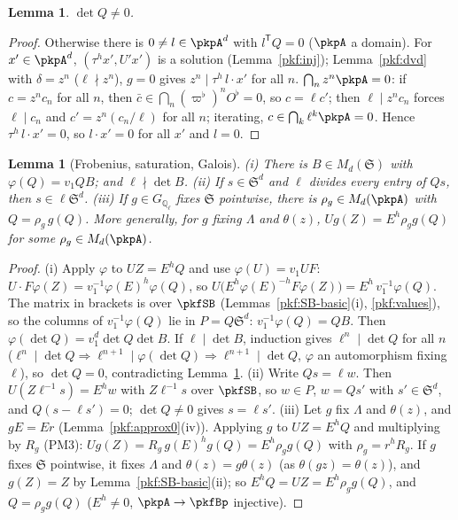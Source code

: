 \documentclass[10pt]{amsart}
\newtheorem{lemma}[theorem]{Lemma}
\theoremstyle{definition}
\theoremstyle{remark}
\newcommand{\Q}{\mathbb Q}
\begin{document}
\begin{lemma}\label{pkf:detQ}
$\det Q\ne0$.
\end{lemma}

\begin{proof}
Otherwise there is $0\ne l\in\pkpA^d$ with $l^{\mathsf T}Q=0$ ($\pkpA$ a domain). For $x'\in\pkpA^d$,
$(\tau^hx',U'x')$ is a solution (Lemma~\ref{pkf:inj}); Lemma~\ref{pkf:dvd} with $\delta=z^n$
($\ell\nmid z^n$), $g=0$ gives $z^n\mid\tau^h\,l\cdot x'$ for all $n$. \emph{$\bigcap_nz^n\pkpA=0$}: if
$c=z^nc_n$ for all $n$, then $\bar c\in\bigcap_n(\varpi^\flat)^nO^\flat=0$, so $c=\ell c'$; then $\ell\mid
z^nc_n$ forces $\ell\mid c_n$ and $c'=z^n(c_n/\ell)$ for all $n$; iterating, $c\in\bigcap_k\ell^k\pkpA=0$.
Hence $\tau^h\,l\cdot x'=0$, so $l\cdot x'=0$ for all $x'$ and $l=0$.
\end{proof}

\begin{lemma}[Frobenius, saturation, Galois]\label{pkf:FSG}
(i) There is $B\in M_d(\mathfrak S)$ with $\varphi(Q)=v_1QB$; and $\ell\nmid\det B$.
(ii) If $s\in\mathfrak S^d$ and $\ell$ divides every entry of $Qs$, then $s\in\ell\mathfrak S^d$.
(iii) If $g\in G_{\Q_\ell}$ fixes $\mathfrak S$ pointwise, there is $\rho_g\in M_d(\pkpA)$ with
$Q=\rho_g\,g(Q)$. More generally, for $g$ fixing $\Lambda$ and $\theta(z)$, $Ug(Z)=E^h\rho_gg(Q)$ for some
$\rho_g\in M_d(\pkpA)$.
\end{lemma}

\begin{proof}
(i) Apply $\varphi$ to $UZ=E^hQ$ and use $\varphi(U)=v_1UF$: $U\cdot F\varphi(Z)=v_1^{-1}\varphi(E)^h
\varphi(Q)$, so $U\bigl(E^h\varphi(E)^{-h}F\varphi(Z)\bigr)=E^h\,v_1^{-1}\varphi(Q)$. The matrix in brackets
is over $\pkfSB$ (Lemmas~\ref{pkf:SB-basic}(i), \ref{pkf:values}), so the columns of $v_1^{-1}\varphi(Q)$
lie in $P=Q\mathfrak S^d$: $v_1^{-1}\varphi(Q)=QB$. Then $\varphi(\det Q)=v_1^d\det Q\det B$. If
$\ell\mid\det B$, induction gives $\ell^n\mid\det Q$ for all $n$ ($\ell^n\mid\det Q\Rightarrow\ell^{n+1}\mid
\varphi(\det Q)\Rightarrow\ell^{n+1}\mid\det Q$, $\varphi$ an automorphism fixing $\ell$), so $\det Q=0$,
contradicting Lemma~\ref{pkf:detQ}.
(ii) Write $Qs=\ell w$. Then $U(Z\ell^{-1}s)=E^hw$ with $Z\ell^{-1}s$ over $\pkfSB$, so $w\in P$, $w=Qs'$
with $s'\in\mathfrak S^d$, and $Q(s-\ell s')=0$; $\det Q\ne0$ gives $s=\ell s'$.
(iii) Let $g$ fix $\Lambda$ and $\theta(z)$, and $gE=Er$ (Lemma~\ref{pkf:approx0}(iv)). Applying $g$ to
$UZ=E^hQ$ and multiplying by $R_g$ (PM3): $Ug(Z)=R_g\,g(E)^hg(Q)=E^h\rho_gg(Q)$ with
$\rho_g=r^hR_g$. If $g$ fixes $\mathfrak S$ pointwise, it fixes $\Lambda$ and $\theta(z)=g\theta(z)$
(as $\theta(gz)=\theta(z)$), and $g(Z)=Z$ by Lemma~\ref{pkf:SB-basic}(ii); so $E^hQ=UZ=E^h\rho_gg(Q)$, and
$Q=\rho_gg(Q)$ ($E^h\ne0$, $\pkpA\to\pkfBp$ injective).
\end{proof}
\end{document}
